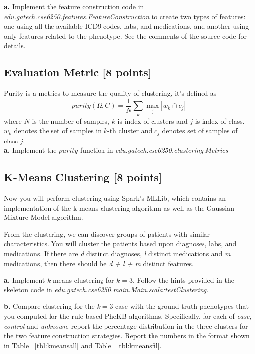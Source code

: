 \documentclass[12pt]{article}
\begin{document}
\textbf{a.} Implement the feature construction code in \textit{edu.gatech.cse6250.features.FeatureConstruction} to create two types of features: one using all the available ICD9 codes, labs, and medications, and another using only features related to the phenotype. See the comments of the source code for details.

\subsection{Evaluation Metric [8 points]}
Purity is a metrics to measure the quality of clustering, it's defined as
$$
purity(\Omega, C) = \frac{1}{N}\sum_k \max_j |w_k \cap c_j|
$$
 where $N$ is the number of samples, $k$ is index of clusters and $j$ is index of class. $w_k$ denotes the set of samples in $k$-th cluster and $c_j$ denotes set of samples of class $j$. \\
 
\textbf{a.} Implement the $purity$ function in \textit{edu.gatech.cse6250.clustering.Metrics}

\subsection{K-Means Clustering [8 points] } 
Now you will perform clustering using Spark's MLLib, which contains an implementation of the k-means clustering algorithm as well as the Gaussian Mixture Model algorithm.

From the clustering, we can discover groups of patients with similar characteristics. You will cluster the patients based upon diagnoses, labs, and medications. If there are \textit{d} distinct diagnoses, \textit{l} distinct medications and \textit{m} medications, then there should be \textit{d + l + m} distinct features.

\textbf{a.} Implement $k$-means clustering for $k=3$. Follow the hints provided in the skeleton code in \textit{edu.gatech.cse6250.main.Main.scala:testClustering}.

\textbf{b.} Compare clustering for the $k=3$ case with the ground truth phenotypes that you computed for the rule-based PheKB algorithms. Specifically, for each of \textit{case}, \textit{control} and \textit{unknown}, report the percentage distribution in the three clusters for the two feature construction strategies. Report the numbers in the format shown in Table ~\ref{tbl:kmeansall} and Table ~\ref{tbl:kmeansfil}. \\
\end{document}

